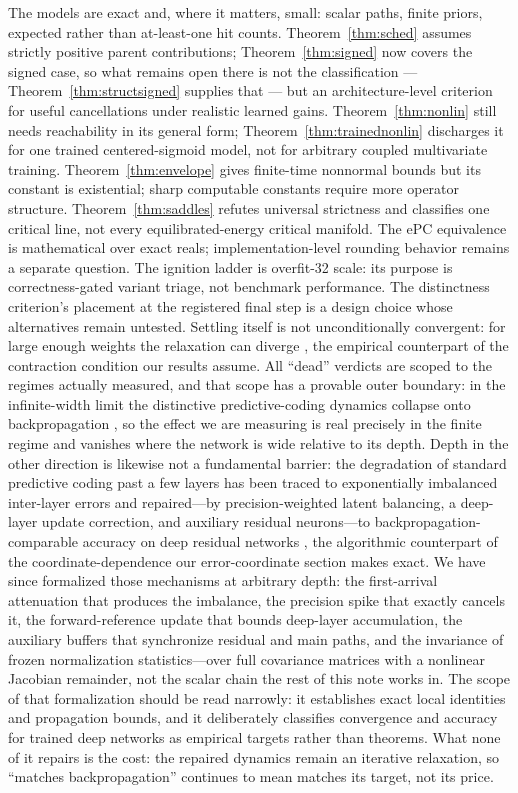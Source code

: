 \documentclass[11pt]{article}
\begin{document}
The models are exact and, where it matters, small: scalar paths, finite priors, expected
rather than at-least-one hit counts. Theorem~\ref{thm:sched} assumes strictly positive
parent contributions; Theorem~\ref{thm:signed} now covers the signed case, so what remains
open there is not the classification --- Theorem~\ref{thm:structsigned} supplies that ---
but an architecture-level criterion for useful cancellations under realistic learned
gains. Theorem~\ref{thm:nonlin} still needs reachability in its general form;
Theorem~\ref{thm:trainednonlin} discharges it for one trained centered-sigmoid model, not
for arbitrary coupled multivariate training. Theorem~\ref{thm:envelope} gives finite-time
nonnormal bounds but its constant is existential; sharp computable constants require more
operator structure. Theorem~\ref{thm:saddles} refutes universal strictness and classifies
one critical line, not every equilibrated-energy critical manifold. The ePC equivalence
is mathematical over exact reals; implementation-level rounding behavior remains a
separate question. The ignition ladder is overfit-32 scale: its purpose is
correctness-gated variant triage, not benchmark performance. The distinctness criterion's
placement at the registered final step is a design choice whose alternatives remain
untested. Settling itself is not unconditionally convergent: for large enough weights the
relaxation can diverge \cite{frieder2022}, the empirical counterpart of the contraction
condition our results assume. All ``dead'' verdicts are scoped to the regimes actually
measured, and that scope has a provable outer boundary: in the infinite-width limit the
distinctive predictive-coding dynamics collapse onto backpropagation \cite{innocenti2026},
so the effect we are measuring is real precisely in the finite regime and vanishes where
the network is wide relative to its depth. Depth in the other direction is likewise not a
fundamental barrier: the degradation of standard predictive coding past a few layers has
been traced to exponentially imbalanced inter-layer errors and repaired---by
precision-weighted latent balancing, a deep-layer update correction, and auxiliary
residual neurons---to backpropagation-comparable accuracy on deep residual networks
\cite{qi2025}, the algorithmic counterpart of the coordinate-dependence our
error-coordinate section makes exact. We have since formalized those mechanisms at
arbitrary depth: the first-arrival attenuation that produces the imbalance, the precision
spike that exactly cancels it, the forward-reference update that bounds deep-layer
accumulation, the auxiliary buffers that synchronize residual and main paths, and the
invariance of frozen normalization statistics---over full covariance matrices with a
nonlinear Jacobian remainder, not the scalar chain the rest of this note works in. The
scope of that formalization should be read narrowly: it establishes exact local
identities and propagation bounds, and it deliberately classifies convergence and
accuracy for trained deep networks as empirical targets rather than theorems. What none
of it repairs is the cost: the repaired dynamics remain an iterative relaxation, so
``matches backpropagation'' continues to mean matches its target, not its price.
\end{document}
